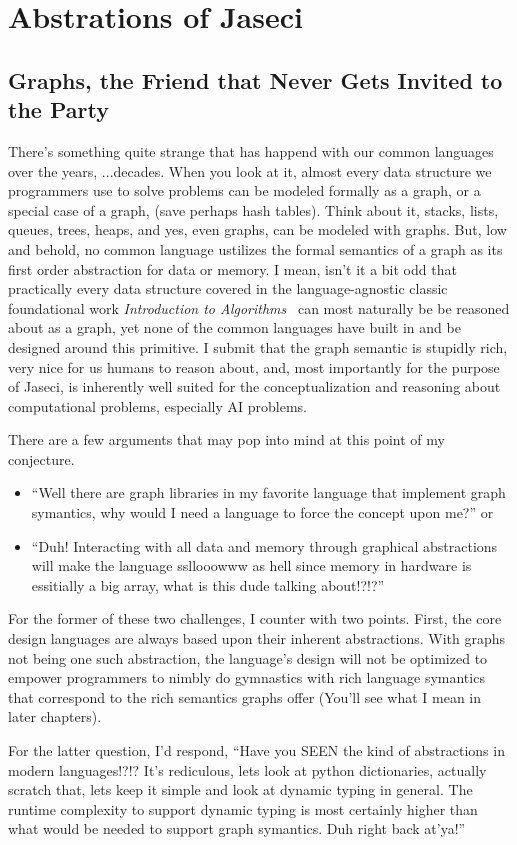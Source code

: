 \chapter{Abstrations of Jaseci}
\section{Graphs, the Friend that Never Gets Invited to the Party}
There's something quite strange that has happend with our \gls{common languages} over the years, ...decades. When you look at it, almost every data structure we programmers use to solve problems can be modeled formally as a graph, or a special case of a graph, (save perhaps hash tables). Think about it, stacks, lists, queues, trees, heaps, and yes, even graphs, can be modeled with graphs. But, low and behold, no common language ustilizes the formal semantics of a graph as its first order abstraction for data or memory. I mean, isn't it a bit odd that practically every data structure covered in the language-agnostic classic foundational work \textit{Introduction to Algorithms}~\cite{intro_to_algo} can most naturally be be reasoned about as a graph, yet none of the common languages have built in and be designed around this primitive. I submit that the graph semantic is stupidly rich, very nice for us humans to reason about, and, most importantly for the purpose of Jaseci, is inherently well suited for the conceptualization and reasoning about computational problems, especially AI problems.
\par
There are a few arguments that may pop into mind at this point of my conjecture.
\begin{itemize}
    \item ``Well there are graph libraries in my favorite language that implement graph symantics, why would I need a language to force the concept upon me?''
          or
    \item ``Duh! Interacting with all data and memory through graphical abstractions will make the language ssllooowww as hell since memory in hardware is essitially a big array, what is this dude talking about!?!?''
\end{itemize}
\par
For the former of these two challenges, I counter with two points. First, the core design languages are always based upon their inherent abstractions. With graphs not being one such abstraction, the language's design will not be optimized to empower programmers to nimbly do gymnastics with rich language symantics that correspond to the rich semantics graphs offer (You'll see what I mean in later chapters).
\par
For the latter question, I'd respond, ``Have you SEEN the kind of abstractions in modern languages!?!? It's rediculous, lets look at python dictionaries, actually scratch that, lets keep it simple and look at dynamic typing in general. The runtime complexity to support dynamic typing is most certainly higher than what would be needed to support graph symantics. Duh right back at'ya!''
